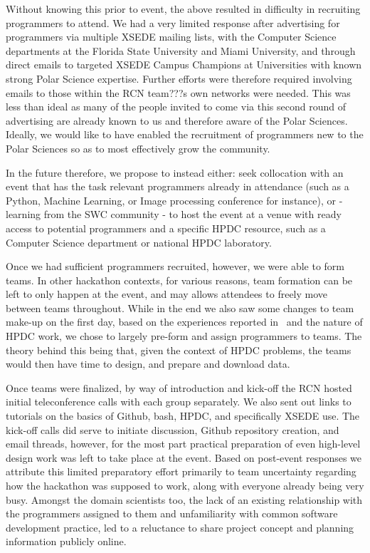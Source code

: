 \documentclass[conference]{IEEEtran}
\begin{document}
Without knowing this prior to event, the above resulted in difficulty in recruiting programmers to attend.  We had a very limited response after advertising for programmers via multiple XSEDE mailing lists, with the Computer Science departments at the Florida State University and Miami University, and through direct emails to targeted XSEDE Campus Champions at Universities with known strong Polar Science expertise. Further efforts were therefore required involving emails to those within the RCN team???s own networks were needed. This was less than ideal as many of the people invited to come via this second round of advertising are already known to us and therefore aware of the Polar Sciences. Ideally, we would like to have enabled the recruitment of programmers new to the Polar Sciences so as to most effectively grow the community.  

In the future therefore, we propose to instead either: seek collocation with an event that has the task relevant programmers already in attendance (such as a Python, Machine Learning, or Image processing conference for instance), or - learning from the SWC community - to host the event at a venue with ready access to potential programmers and a specific HPDC resource, such as a Computer Science department or national HPDC laboratory.

Once we had sufficient programmers recruited, however, we were able to form teams. In other hackathon contexts, for various reasons, team formation can be left to only happen at the event, and may allows attendees to freely move between teams throughout. While in the end we also saw some changes to team make-up on the first day, based on the experiences reported in~\cite{mattmann2015} and the nature of HPDC work, we chose to largely pre-form and assign programmers to teams.  The theory behind this being that, given the context of HPDC problems, the teams would then have time to design, and prepare and download data.

Once teams were finalized, by way of introduction and kick-off the RCN hosted initial teleconference calls with each group separately.  We also sent out links to tutorials on the basics of Github, bash, HPDC, and specifically XSEDE use. The kick-off calls did serve to initiate discussion, Github repository creation, and email threads, however, for the most part practical preparation of even high-level design work was left to take place at the event.  Based on post-event responses we attribute this limited preparatory effort primarily to team uncertainty regarding how the hackathon was supposed to work, along with everyone already being very busy.  Amongst the domain scientists too, the lack of an existing relationship with the programmers assigned to them and unfamiliarity with common software development practice, led to a reluctance to share project concept and planning information publicly online.
\end{document}
